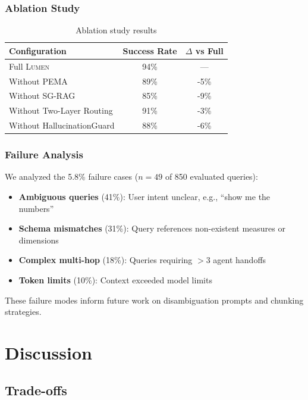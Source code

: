 \documentclass[11pt,a4paper]{article}
\theoremstyle{definition}
\theoremstyle{remark}
\newcommand{\lumen}{\textsc{Lumen}\xspace}
\newcommand{\pema}{\textsc{PEMA}\xspace}
\newcommand{\sgrag}{\textsc{SG-RAG}\xspace}
\begin{document}
\subsubsection{Ablation Study}

\begin{table}[H]
\centering
\begin{tabular}{lcc}
\toprule
\textbf{Configuration} & \textbf{Success Rate} & \textbf{$\Delta$ vs Full} \\
\midrule
Full \lumen & 94\% & --- \\
Without \pema & 89\% & -5\% \\
Without \sgrag & 85\% & -9\% \\
Without Two-Layer Routing & 91\% & -3\% \\
Without HallucinationGuard & 88\% & -6\% \\
\bottomrule
\end{tabular}
\caption{Ablation study results}
\label{tab:ablation}
\end{table}

\subsubsection{Failure Analysis}

We analyzed the 5.8\% failure cases ($n=49$ of 850 evaluated queries):

\begin{itemize}
    \item \textbf{Ambiguous queries} (41\%): User intent unclear, e.g., ``show me the numbers''
    \item \textbf{Schema mismatches} (31\%): Query references non-existent measures or dimensions
    \item \textbf{Complex multi-hop} (18\%): Queries requiring $>3$ agent handoffs
    \item \textbf{Token limits} (10\%): Context exceeded model limits
\end{itemize}

These failure modes inform future work on disambiguation prompts and chunking strategies.

\section{Discussion}
\label{sec:discussion}

\subsection{Trade-offs}
\end{document}
